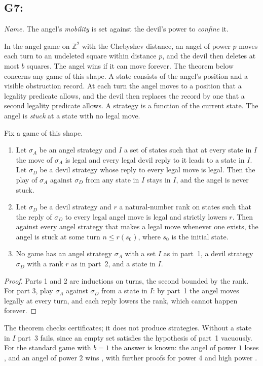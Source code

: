\subsection{G7: \lawGSeven}\label{sec:G7}

\emph{Name.} The angel's \emph{mobility} is set against the devil's power to \emph{confine} it.

In the angel game on $\mathbb{Z}^2$ with the Chebyshev distance, an angel of power $p$ moves each turn
to an undeleted square within distance $p$, and the devil then deletes at most $b$ squares. The angel
wins if it can move forever. The theorem below concerns any game of this shape. A state consists of
the angel's position and a visible obstruction record. At each turn the angel moves to a position
that a legality predicate allows, and the devil then replaces the record by one that a second
legality predicate allows. A strategy is a function of the current state. The angel is
\emph{stuck} at a state with no legal move.

\begin{theorem}\label{thm:G7}
Fix a game of this shape.
\begin{enumerate}
  \item Let $\sigma_A$ be an angel strategy and $I$ a set of states
    such that at every state in $I$ the move of $\sigma_A$ is legal and every legal devil reply to it
    leads to a state in $I$. Let $\sigma_D$ be a devil strategy whose reply to every legal move is
    legal. Then the play of $\sigma_A$ against $\sigma_D$ from any state in $I$ stays in $I$, and
    the angel is never stuck.
  \item Let $\sigma_D$ be a devil strategy and $r$ a
    natural-number rank on states such that the reply of $\sigma_D$ to every legal angel move is
    legal and strictly lowers $r$. Then against every angel strategy that makes a legal move
    whenever one exists, the angel is stuck at some turn $n \le r(s_0)$, where $s_0$ is the
    initial state.
  \item No game has an angel strategy $\sigma_A$ with a set $I$ as in part~1, a devil strategy
    $\sigma_D$ with a rank $r$ as in part~2, and a state in $I$.
\end{enumerate}
\end{theorem}

\begin{proof}
Parts 1 and 2 are inductions on turns, the second bounded by the rank. For part 3, play $\sigma_A$
against $\sigma_D$ from a state in $I$: by part~1 the angel moves legally at every turn, and each
reply lowers the rank, which cannot happen forever.
\end{proof}

The theorem checks certificates; it does not produce strategies. Without a state in $I$ part~3
fails, since an empty set satisfies the hypothesis of part~1 vacuously. For the standard game with
$b = 1$ the answer is known: the angel of power $1$ loses \citep{BerlekampConwayGuy1982,Conway1996},
and an angel of power $2$ wins \citep{Mathe2007,Kloster2007}, with further proofs for power $4$ and
high power \citep{Bowditch2007,Gacs2007}.

